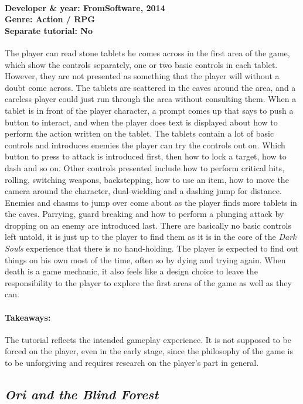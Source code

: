 \paragraph{Developer \& year: FromSoftware, 2014 \\ Genre: Action / RPG \\ Separate tutorial: No \\}
The player can read stone tablets he comes across in the first area of the game, which show the controls separately, one or two basic controls in each tablet. However, they are not presented as something that the player will without a doubt come across. The tablets are scattered in the caves around the area, and a careless player could just run through the area without consulting them. When a tablet is in front of the player character, a prompt comes up that says to push a button to interact, and when the player does text is displayed about how to perform the action written on the tablet. The tablets contain a lot of basic controls and introduces enemies the player can try the controls out on. Which button to press to attack is introduced first, then how to lock a target, how to dash and so on. Other controls presented include how to perform critical hits, rolling, switching weapons, backstepping, how to use an item, how to move the camera around the character, dual-wielding and a dashing jump for distance. Enemies and chasms to jump over come about as the player finds more tablets in the caves. Parrying, guard breaking and how to perform a plunging attack by dropping on an enemy are introduced last. There are basically no basic controls left untold, it is just up to the player to find them as it is in the core of the \textit{Dark Souls} experience that there is no hand-holding. The player is expected to find out things on his own most of the time, often so by dying and trying again. When death is a game mechanic, it also feels like a design choice to leave the responsibility to the player to explore the first areas of the game as well as they can.
\paragraph{Takeaways:}
The tutorial reflects the intended gameplay experience. It is not supposed to be forced on the player, even in the early stage, since the philosophy of the game is to be unforgiving and requires research on the player's part in general. 

\subsection{\textit{Ori and the Blind Forest}}
